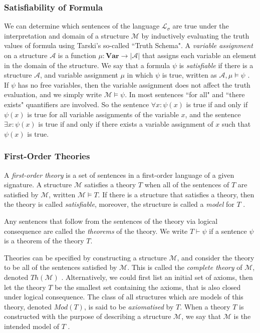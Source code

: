 \documentclass[11pt]{article}
\theoremstyle{definition}
\theoremstyle{theorem}
\theoremstyle{lemma}
\begin{document}
\subsubsection{Satisfiability of Formula}
We can determine which sentences of the language $\mathcal{L_\sigma}$ are true under the interpretation and domain of a structure $\mathcal{M}$ by inductively evaluating the truth values of formula using Tarski's so-called ``Truth Schema"\cite{tarski}.
A \emph{variable assignment} on a structure $\mathcal{A}$ is a function $\mu: \textbf{Var} \rightarrow |\mathcal{A}|$ that assigns each variable an element in the domain of the structure.
We say that a formula $\psi$ is \emph{satisfiable} if there is a structure $\mathcal A$, and variable assignment $\mu$ in which $\psi$ is true, written as $\mathcal{A}, \mu \vDash \psi$ \cite[ch.~2.3]{selinger}.\\

\noindent
If $\psi$ has no free variables, then the variable assignment does not affect the truth evaluation, and we simply write $\mathcal{M} \vDash \psi$.
In most sentences ``for all" and ``there exists" quantifiers are involved.
So the sentence $\forall x: \psi(x)$ is true if and only if $\psi(x)$ is true for all variable assignments of the variable $x$, and the sentence $\exists x: \psi(x)$ is true if and only if there exists a variable assignment of $x$ such that $\psi(x)$ is true.

\subsubsection{First-Order Theories}
A \emph{first-order theory} is a set of sentences in a first-order language of a given signature.
A structure $\mathcal M$ satisfies a theory $T$ when all of the sentences of $T$ are satisfied by $\mathcal{M}$, written $\mathcal{M} \vDash T$. If there is a structure that satisfies a theory, then the theory is called \emph{satisfiable}, moreover, the structure is called a \emph{model} for $T$ \cite[ch.~2.5]{selinger}.

Any sentences that follow from the sentences of the theory via logical consequence are called the \emph{theorems} of the theory. We write $T\vdash \psi$ if a sentence $\psi$ is a theorem of the theory $T$.

Theories can be specified by constructing a structure $\mathcal{M}$, and consider the theory to be all of the sentences satisfied by $\mathcal{M}$. This is called the \emph{complete theory} of $\mathcal{M}$, denoted $\mathit{Th}(\mathcal{M})$ \cite[ch.~1]{stanmodel}.
Alternatively, we could first list an initial set of axioms, then let the theory $T$ be the smallest set containing the axioms, that is also closed under logical consequence. The class of all structures which are models of this theory, denoted $\mathit{Mod(T)}$, is said to be \emph{axiomatised} by $T$.
When a theory $T$ is constructed with the purpose of describing a structure $\mathcal{M}$, we say that $\mathcal{M}$ is the intended model of $T$ \cite[ch.~2.2]{shortermodel}.
\end{document}
